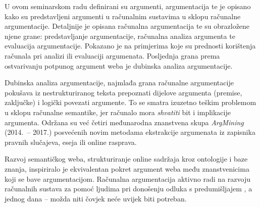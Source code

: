 U ovom seminarskom radu definirani su argumenti, argumentacija 
te je opisano kako su predstavljeni
argumenti u računalnim sustavima u sklopu računalne argumentacije. 
Detaljnije je opisana računalna argumentacija te su obrazložene 
njene grane: predstavljanje argumentacije, računalna analiza argumenta 
te evaluacija argumentacije. Pokazano je na primjerima
koje su prednosti korištenja računala pri analizi 
ili evaluaciji argumenata.  
Posljednja grana prema ostvarivanju potpunog 
argument weba je dubinska analiza argumentacije. 

Dubinska analiza argumentacije, najmlađa grana računalne argumentacije 
pokušava iz nestrukturiranog teksta
prepoznati dijelove argumenta (premise, zaključke)
i logički povezati argumente. To se 
smatra izuzetno teškim problemom 
u sklopu računalne semantike, jer računalo 
mora \emph{shvatiti} bit i implikacije argumenta. 
Održana su već četiri međunarodna  znanstvena 
skupa \emph{ArgMining} (2014.\ -- 2017.) posvećenih novim metodama
ekstrakcije argumenata iz zapisnika pravnih slučajeva,
eseja ili online rasprava.

Razvoj semantičkog weba, strukturiranje 
online sadržaja kroz ontologije i baze znanja, 
inspiriralo je ekvivalentan pokret 
argument weba među
znanstvenicima koji se bave argumentacijom.
Računalna argumentacija 
aktivno radi na razvoju računalnih sustava
za pomoć ljudima pri 
donošenju odluka s predumišljajem ,
a jednog dana --
možda niti čovjek neće uvijek biti potreban.

 
 

